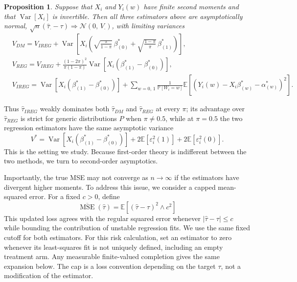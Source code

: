 \documentclass{article}
\newcommand{\nn}{\mathcal{N}}
\newcommand{\EE}[1]{\mathbb{E}\left[#1\right]}
\newcommand{\Var}[1]{\operatorname{Var}\left[#1\right]}
\newcommand{\PP}[1]{\mathbb{P}\left[#1\right]}
\newcommand{\p}[1]{\left(#1\right)}
\newcommand{\htau}{\hat{\tau}}
\theoremstyle{plain}
\newtheorem{prop}{Proposition}
\theoremstyle{definition}
\theoremstyle{remark}
\begin{document}
\begin{prop}
\label{prop:first_order}
Suppose that $X_i$ and $Y_i(w)$ have finite second moments and that $\Var{X_i}$ is invertible. Then all three estimators above are asymptotically normal, $\sqrt{n}(\htau_\cdot - \tau) \Rightarrow \nn(0, \, V_\cdot)$, with limiting variances
\begin{equation}
\begin{split}
&V_{DM} = V_{IREG} +  \Var{X_i\p{\sqrt{\frac{\pi}{1 - \pi}} \, \beta_{(0)}^* + \sqrt{\frac{1 - \pi}{\pi}} \, \beta_{(1)}^*}}, \\
&V_{REG} = V_{IREG} + \frac{\p{1 - 2\pi}^2}{\pi(1 - \pi)} \Var{X_i\p{\beta_{(1)}^* - \beta_{(0)}^*}}, \\
&V_{IREG} = \Var{X_i\p{\beta_{(1)}^* - \beta_{(0)}^*}} + \sum_{w = 0, \, 1} \frac{1}{\PP{W_i = w}} \EE{\p{Y_i(w) - X_i\beta_{(w)}^* - \alpha_{(w)}^*}^2}.
\end{split}
\end{equation}
\end{prop}

Thus $\htau_{IREG}$ weakly dominates both $\htau_{DM}$ and $\htau_{REG}$ at every $\pi$; its advantage over $\htau_{REG}$ is strict for generic distributions $P$ when $\pi\neq0.5$, while at $\pi = 0.5$ the two regression estimators have the same asymptotic variance
\begin{equation}
\label{eq:Vstar}
V^* = \Var{X_i\p{\beta_{(1)}^* - \beta_{(0)}^*}} + 2\EE{\varepsilon^2_i(1)} + 2\EE{\varepsilon^2_i(0)}.
\end{equation}
This is the setting we study. Because first-order theory is indifferent between the two methods, we turn to second-order asymptotics.

Importantly, the true MSE may not converge as $n\rightarrow\infty$ if the estimators have divergent higher moments. To address this issue, we consider a capped mean-squared error. For a fixed $c>0$, define
\begin{equation}
\label{eq:capped_mse}
\overline{\operatorname{MSE}}\p{\htau} = \EE{\p{\htau - \tau}^2 \land c^2}
\end{equation}
This updated loss agrees with the regular squared error whenever $|\htau-\tau|\le c$ while bounding the contribution of unstable regression fits. We use the same fixed cutoff for both estimators. For this risk calculation, set an estimator to zero whenever its least-squares fit is not uniquely defined, including an empty treatment arm. Any measurable finite-valued completion gives the same expansion below. The cap is a loss convention depending on the target $\tau$, not a modification of the estimator. 
\end{document}
